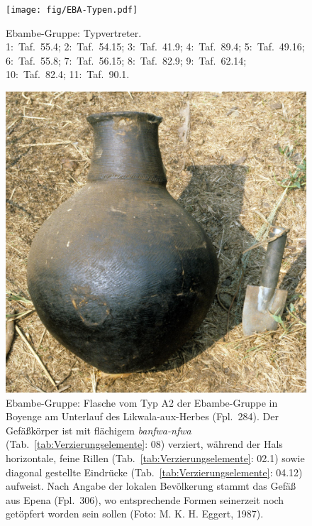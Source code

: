 \begin{figure}[p]
	\centering
	\texttt{[image: fig/EBA-Typen.pdf]}
	\caption{Ebambe-Gruppe: Typvertreter.\\1:~Taf.~55.4; 2:~Taf.~54.15; 3:~Taf.~41.9; 4:~Taf.~89.4; 5:~Taf.~49.16; 6:~Taf.~55.8; 7:~Taf.~56.15; 8:~Taf.~82.9; 9:~Taf.~62.14; 10:~Taf.~82.4; 11:~Taf.~90.1.}
	\label{fig:EBA_Typvertreter}
\end{figure}

\begin{figure}[tb]
	\begin{minipage}[b]{\columnwidth}
		\includegraphics[width=\textwidth]{fig/BYN87-101_Gef_aus_Epena_E87-023-10.jpg}
	\end{minipage}\hfill
	\begin{minipage}[b]{\columnwidth}
		\caption{Ebambe-Gruppe: Flasche vom Typ A2 der Ebambe-Gruppe in Boyenge am Unterlauf des \mbox{Likwala}-\mbox{aux}-\mbox{Herbes} (Fpl.~284). Der Gefäßkörper ist mit flächigem \textit{banfwa-nfwa} (Tab.~\ref{tab:Verzierungselemente}: 08) verziert, während der Hals horizontale, feine Rillen (Tab.~\ref{tab:Verzierungselemente}: 02.1) sowie diagonal gestellte Eindrücke (Tab.~\ref{tab:Verzierungselemente}: 04.12) aufweist. Nach Angabe der lokalen Bevölkerung stammt das Gefäß aus Epena (Fpl.~306), wo entsprechende Formen seinerzeit noch getöpfert worden sein sollen (Foto: M. K. H. Eggert, 1987).}\label{fig:EBA_BoyengeE8702310}
	\end{minipage}
\end{figure}

